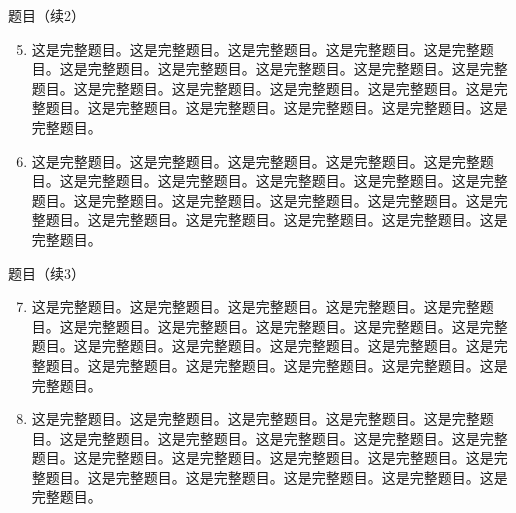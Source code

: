 \documentclass[aspectratio=169,10pt,fontset=fandol]{ctexbeamer}
\begin{document}
\begin{frame}[t,fragile]{题目（续2）}
\small
{\small
\begin{enumerate}\setcounter{enumi}{4}
\item 这是完整题目。这是完整题目。这是完整题目。这是完整题目。这是完整题目。这是完整题目。这是完整题目。这是完整题目。这是完整题目。这是完整题目。这是完整题目。这是完整题目。这是完整题目。这是完整题目。这是完整题目。这是完整题目。这是完整题目。这是完整题目。这是完整题目。这是完整题目。
\item 这是完整题目。这是完整题目。这是完整题目。这是完整题目。这是完整题目。这是完整题目。这是完整题目。这是完整题目。这是完整题目。这是完整题目。这是完整题目。这是完整题目。这是完整题目。这是完整题目。这是完整题目。这是完整题目。这是完整题目。这是完整题目。这是完整题目。这是完整题目。

\end{enumerate}
}
\end{frame}
\begin{frame}[t,fragile]{题目（续3）}
\small
{\small
\begin{enumerate}\setcounter{enumi}{6}
\item 这是完整题目。这是完整题目。这是完整题目。这是完整题目。这是完整题目。这是完整题目。这是完整题目。这是完整题目。这是完整题目。这是完整题目。这是完整题目。这是完整题目。这是完整题目。这是完整题目。这是完整题目。这是完整题目。这是完整题目。这是完整题目。这是完整题目。这是完整题目。
\item 这是完整题目。这是完整题目。这是完整题目。这是完整题目。这是完整题目。这是完整题目。这是完整题目。这是完整题目。这是完整题目。这是完整题目。这是完整题目。这是完整题目。这是完整题目。这是完整题目。这是完整题目。这是完整题目。这是完整题目。这是完整题目。这是完整题目。这是完整题目。\end{enumerate}
}
\end{frame}
\end{document}
